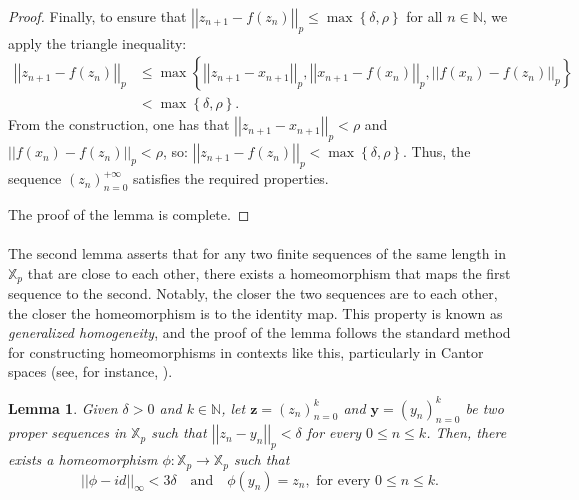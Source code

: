 \documentclass[a4paper, 12pt]{article}
\newtheorem{lemma}[theorem]{Lemma}
\theoremstyle{definition}
\begin{document}
\begin{proof}
		Finally, to ensure that $ \left| \left|  z_{n+1} - f \left(  z_{n}  \right)   \right|  \right|_{p} \le \max \left\{  \delta, \rho  \right\} $ for all $n \in \mathbb{N} $, we apply the triangle inequality:
		\begin{align*}
			\left| \left|  z_{n+1} - f \left(  z_{n}  \right)   \right|  \right|_{p}    &\le    \max \left\{   \left| \left|  z_{n+1} - x_{n+1}  \right|  \right|_{p},    \left| \left|  x_{n+1} - f \left(  x_{n}  \right)   \right|  \right|_{p},    \left| \left|  f \left(  x_{n}  \right)  - f \left(  z_{n}  \right)   \right|  \right|_{p}  \right\}   \\ 
			& <  \max \left\{  \delta, \rho  \right\}  .
		\end{align*}
		From the construction, one has that $ \left| \left|  z_{n+1} - x_{n+1}  \right|  \right|_{p}  < \rho$ and $ \left| \left|  f \left(  x_{n}  \right)  - f \left(  z_{n}  \right)   \right|  \right|_{p} < \rho$, so: $  \left| \left|  z_{n+1} - f \left(  z_{n}  \right)   \right|  \right|_{p} <  \max \left\{  \delta, \rho  \right\}  $. Thus, the sequence $ \left(  z_{n}   \right)_{n=0}^{+ \infty }$ satisfies the required properties. 
		
		The proof of the lemma is complete. 
		
		
	\end{proof}
	
	
	
	
	
	\paragraph{}
	
	
	
	
	
	The second lemma asserts that for any two finite sequences of the same length in $\mathbb{X}_{p}$ that are close to each other, there exists a homeomorphism that maps the first sequence to the second. Notably, the closer the two sequences are to each other, the closer the homeomorphism is to the identity map. 
	This property is known as \textit{generalized homogeneity}, and the proof of the lemma follows the standard method for constructing homeomorphisms in contexts like this, particularly in Cantor spaces (see, for instance, \cite[Lemma 1.1]{Kawaguchi_Topological_Stability_and_Shadowing_of_Zero-dimensional_Dynamical_Systems}). 
	
	
	
	
	\begin{lemma}\label{Lem3_Continued Translation of Points}
		Given $ \delta  > 0$ and $k \in \mathbb{N} $, let $ \mathbf{z} =  \left(  z_{n}   \right)_{n=0}^{k}$ and $ \mathbf{y} =  \left(  y_{n}   \right)_{n=0}^{k}$ be two proper sequences in $\mathbb{X}_{p}$ such that $ \left| \left|  z_{n} - y_{n}  \right|  \right|_{p}  < \delta$ for every $0 \le n \le k $. Then, there exists a homeomorphism $\phi: \mathbb{X}_{p} \to \mathbb{X}_{p}$ such that 
		$$ \left| \left|  \phi - id  \right|  \right|_{ \infty }   <    3 \delta \quad \text{and} \quad \phi \left(  y_{n}  \right)    =   z_{n},    \text{ for every } 0   \le   n   \le   k .$$
		
	\end{lemma}
	
\end{document}
